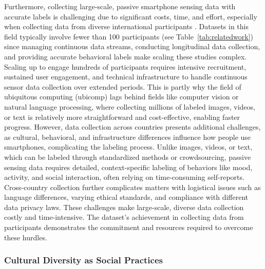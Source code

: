 Furthermore, collecting large-scale, passive smartphone sensing data with accurate labels is challenging due to significant costs, time, and effort, especially when collecting data from diverse international participants \cite{yfantidou2023beyond}. Datasets in this field typically involve fewer than 100 participants (see Table~\ref{tab:relatedwork}) since managing continuous data streams, conducting longitudinal data collection, and providing accurate behavioral labels make scaling these studies complex. Scaling up to engage hundreds of participants requires intensive recruitment, sustained user engagement, and technical infrastructure to handle continuous sensor data collection over extended periods. This is partly why the field of ubiquitous computing (ubicomp) lags behind fields like computer vision or natural language processing, where collecting millions of labeled images, videos, or text is relatively more straightforward and cost-effective, enabling faster progress. However, data collection across countries presents additional challenges, as cultural, behavioral, and infrastructure differences influence how people use smartphones, complicating the labeling process. Unlike images, videos, or text, which can be labeled through standardized methods or crowdsourcing, passive sensing data requires detailed, context-specific labeling of behaviors like mood, activity, and social interaction, often relying on time-consuming self-reports. Cross-country collection further complicates matters with logistical issues such as language differences, varying ethical standards, and compliance with different data privacy laws. These challenges make large-scale, diverse data collection costly and time-intensive. The \dataset dataset’s achievement in collecting data from \nilogusers participants demonstrates the commitment and resources required to overcome these hurdles.

\subsubsection{Cultural Diversity as Social Practices} \label{subsubsec:soa-socio}

